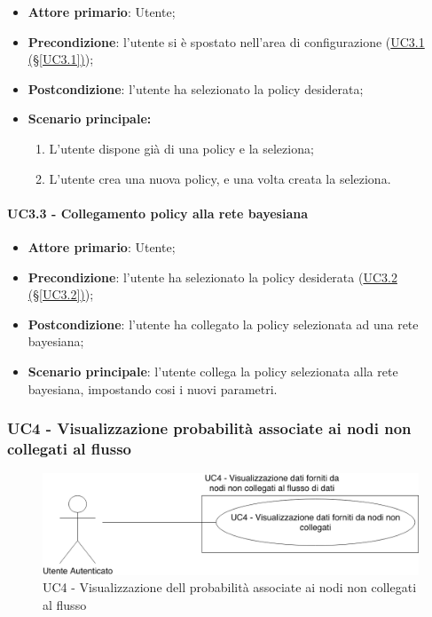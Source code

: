 \begin{itemize}
	\item \textbf{Attore primario}: Utente; 
	\item \textbf{Precondizione}: l'utente si è spostato nell'area di configurazione (\hyperref[UC3.1]{UC3.1 (§\ref*{UC3.1})});
	\item \textbf{Postcondizione}: l'utente ha selezionato la policy desiderata;
	\item \textbf{Scenario principale:}
	\begin{enumerate}
		\item L'utente dispone già di una policy e la seleziona; 
		\item L'utente crea una nuova policy, e una volta creata la seleziona. 
	\end{enumerate}
	
\end{itemize}

\paragraph{UC3.3 - Collegamento policy alla rete bayesiana}\label{UC3.3}
\begin{itemize}
	\item \textbf{Attore primario}: Utente; 
	\item \textbf{Precondizione}: l'utente ha selezionato la policy desiderata (\hyperref[UC3.2]{UC3.2 (§\ref*{UC3.2})});
	\item \textbf{Postcondizione}: l'utente ha collegato la policy selezionata ad una rete bayesiana; 
	\item \textbf{Scenario principale}: l'utente collega la policy selezionata alla rete bayesiana, impostando cosi i nuovi parametri. 
\end{itemize}

\newpage
\subsubsection{UC4 - Visualizzazione probabilità associate ai nodi non collegati al flusso}\label{UC4}

\begin{figure}[H]
\centering
\includegraphics[scale=0.4]{./images/UC4.png}
\caption{UC4 - Visualizzazione dell probabilità associate ai nodi non collegati al flusso}
\end{figure}

